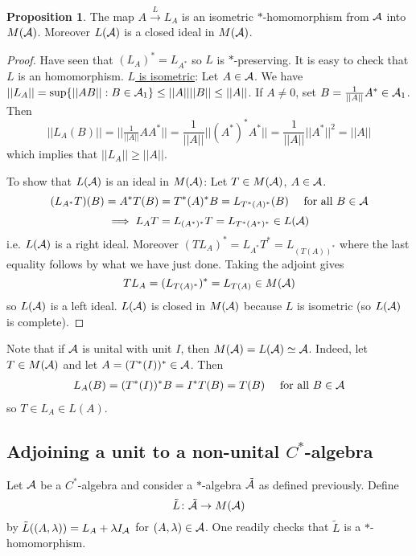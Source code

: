 \documentclass[10pt,english,a4paper]{article}
\theoremstyle{definition}
\newtheorem*{proposition}{Proposition}
\begin{document}
\begin{proposition}
    The map $A \overset{L}{\to} L_A$ is an isometric $*$-homomorphism from 
$\mathcal{A}$ into $M(\mathcal{A})$. Moreover $L(\mathcal{A})$ is a closed ideal in $M(\mathcal{A})$.
\end{proposition}

\begin{proof}
    
Have seen that $(L_A)^* = L_{A^*}$ so $L$ is $*$-preserving. It is easy to 
check that $L$ is an homomorphism. \ul{$L$ is isometric}: Let $A \in \mathcal{A}$.
We have $||L_A|| = \sup \{ ||AB|| : B \in \mathcal{A}_1  \} \leq ||A||||B|| \leq ||A||$.
If $A \neq 0$, set $B = \tfrac{1}{||A||}A^* \in \mathcal{A}_1$. Then 
\[
||L_A(B)|| = ||\tfrac{1}{||A||}AA^*|| = \frac{1}{||A||} ||(A^*)^*A^*|| = \frac{1}{||A||}
||A^*||^2 = ||A||
\]
which implies that $||L_A|| \geq ||A||$.

To show that $L(\mathcal{A})$ is an ideal in $M(\mathcal{A})$: Let $T \in M(\mathcal{A})$, $A \in \mathcal{A}$.
\[ 
(L_{A^*}T)(B) = A^*T(B) = T^*(A)^*B = L_{T^*(A)^*} (B) \quad \text{ for all }B \in \mathcal{A}
\]
\[\implies L_A T = L_{(A^*)^*} T = L_{T^*(A^*)^*} \in L(\mathcal{A})   \]
i.e. $L(\mathcal{A})$ is a right ideal. Moreover $(TL_A)^* = L_{A^*}T^* = L_{(T(A))^*}$
where the last equality follows by what we have just done. 
Taking the adjoint gives
\[ TL_A = (L_{T(A)^*})^* = L_{T(A)}  \in M(\mathcal{A}) \]
so $L(\mathcal{A})$ is a left ideal. $L(\mathcal{A})$ is closed in $M(\mathcal{A})$ because $L$ is isometric 
(so $L(\mathcal{A})$ is complete).
\end{proof}

Note that if $\mathcal{A}$ is unital with unit $I$, then $M(\mathcal{A})= L(\mathcal{A}) \simeq \mathcal{A}$.
Indeed, let $T \in M(\mathcal{A})$ and let $A = (T^*(I))^* \in \mathcal{A}$. Then 
\begin{align*}
    L_{A}(B) = (T^*(I))^*B = I^* T(B)= T(B) \quad \text{ for all } B \in \mathcal{A}
\end{align*}
so $T \in L_{A} \in L(A)$.

\subsection{Adjoining a unit to a non-unital $C^*$-algebra}
Let $\mathcal{A}$ be a $C^*$-algebra and consider a $*$-algebra $\tilde{\mathcal{A}}$ as 
defined previously. Define 
\[ \tilde{L}\colon \tilde{\mathcal{A}} \to M(\mathcal{A}) \]
by $\tilde{L}((A,\lambda)) = L_A + \lambda I_{\mathcal{A}}$ for $(A,\lambda) \in \mathcal{A}$.
One readily checks that $\tilde{L}$ is a $*$-homomorphism.
\end{document}
